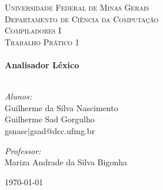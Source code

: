 \begin{titlepage}
\begin{center}

\textsc{\LARGE Universidade Federal de Minas Gerais\\
	Departamento de Ciência da Computação}\\[1.5cm]

\textsc{\Large Compiladores I\\
	Trabalho Prático 1}\\[3.0cm]

\hrulefill \\[0.4cm]
{ \LARGE \bfseries Analisador Léxico}\\[0.4cm]

\hrulefill \\[1.5cm]
\vspace{7cm}
\begin{minipage}{0.4\textwidth}
\begin{flushleft} \large
\emph{Alunos:}\\
Guilherme da Silva Nascimento\\ 
Guilherme Sad Gorgulho\\
{gsnasc|gsad}@dcc.ufmg.br\\
\end{flushleft}
\end{minipage}
\begin{minipage}{0.4\textwidth}
\begin{flushright} \large
\emph{Professor:} \\
Mariza Andrade da Silva Bigonha
\end{flushright}
\end{minipage}

\vfill

{\large \today}

\end{center}
\end{titlepage}
